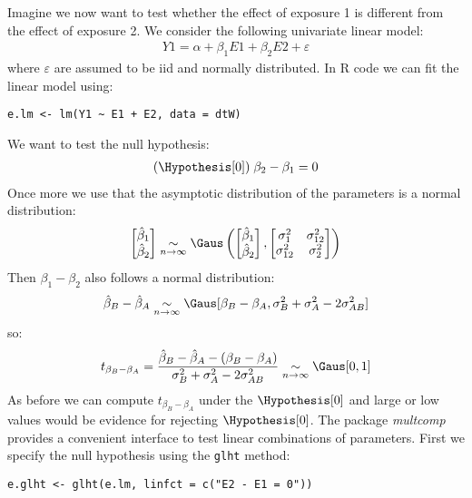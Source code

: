 \documentclass{article}
\begin{document}
Imagine we now want to test whether the effect of exposure 1 is
different from the effect of exposure 2. We consider the following
univariate linear model:
\begin{align*}
Y1 = \alpha + \beta_1 E1 + \beta_2 E2 + \varepsilon
\end{align*}
where \(\varepsilon\) are assumed to be iid and normally
 distributed. In R code we can fit the linear model using:
\lstset{language=r,label= ,caption= ,captionpos=b,numbers=none}
\begin{lstlisting}
e.lm <- lm(Y1 ~ E1 + E2, data = dtW)
\end{lstlisting}

We want to test the null hypothesis:
\begin{align*}
(\Hypothesis[0]) \; \beta_2 - \beta_1 = 0
\end{align*}
Once more we use that the asymptotic distribution of the parameters is
a normal distribution:
\begin{align*}
\begin{bmatrix}
\hat{\beta}_1 \\ \hat{\beta}_2 \\
\end{bmatrix}
\underset{n \rightarrow \infty}{\sim}
\Gaus \left(\begin{bmatrix}
\hat{\beta}_1 \\ \hat{\beta}_2 \\
\end{bmatrix},
\begin{bmatrix}
\sigma^2_1 & \sigma^2_{12} \\
\sigma^2_{12} & \sigma^2_2 \\
\end{bmatrix}
\right)
\end{align*}
Then \(\beta_1 - \beta_2\) also follows a normal distribution:
\begin{align*}
\hat{\beta}_B - \hat{\beta}_A  \underset{n \rightarrow \infty}{\sim} \Gaus[\beta_B - \beta_A,\sigma^2_B+\sigma^2_A-2\sigma^2_{AB}]
\end{align*}
so:
\begin{align*}
t_{\beta_B-\beta_A} = \frac{\hat{\beta}_B - \hat{\beta}_A - (\beta_B - \beta_A)}{\sigma^2_B+\sigma^2_A-2\sigma^2_{AB}}  \underset{n \rightarrow \infty}{\sim} \Gaus[0,1]
\end{align*}
As before we can compute \(t_{\beta_B-\beta_A}\) under the
 \(\Hypothesis[0]\) and large or low values would be evidence for
 rejecting \(\Hypothesis[0]\). The package \emph{multcomp} provides a
 convenient interface to test linear combinations of parameters. First
 we specify the null hypothesis using the \texttt{glht} method:
\lstset{language=r,label= ,caption= ,captionpos=b,numbers=none}
\begin{lstlisting}
e.glht <- glht(e.lm, linfct = c("E2 - E1 = 0"))
\end{lstlisting}
\end{document}
